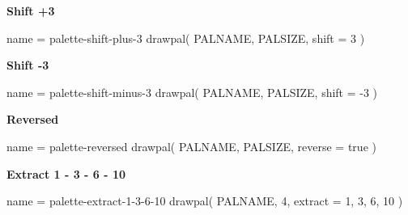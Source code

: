 \documentclass[theme = dark]{tutodoc}
\begin{document}
\bigskip
\bigskip

{\Large\bfseries Shift +3}

\smallskip

\begin{luadraw}{name = palette-shift-plus-3}
drawpal(
  PALNAME, PALSIZE, 
  {shift = 3}
)
\end{luadraw}


\bigskip
\bigskip

{\Large\bfseries Shift -3}

\smallskip

\begin{luadraw}{name = palette-shift-minus-3}
drawpal(
  PALNAME, PALSIZE, 
  {shift = -3}
)
\end{luadraw}



\bigskip
\bigskip

{\Large\bfseries Reversed}

\smallskip

\begin{luadraw}{name = palette-reversed}
drawpal(
  PALNAME, PALSIZE, 
  {reverse = true}
)
\end{luadraw}



\bigskip
\bigskip

{\Large\bfseries Extract 1 - 3 - 6 - 10}

\smallskip

\begin{luadraw}{name = palette-extract-1-3-6-10}
drawpal(
  PALNAME, 4, 
  {extract = {1, 3, 6, 10}}
)
\end{luadraw}
\end{document}
